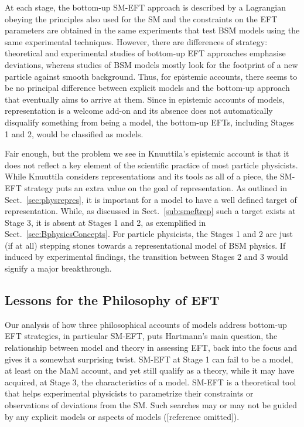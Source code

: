 At each stage, the bottom-up SM-EFT approach is described by a Lagrangian 
obeying the principles also used for the SM and the constraints on the EFT parameters are obtained in the same experiments that test BSM models using the same experimental techniques. 
However, there are differences of strategy: theoretical and experimental studies of bottom-up EFT approaches emphasise deviations, whereas studies of BSM models mostly look for the footprint of a new particle against smooth background.
Thus, for epistemic accounts, there seems to be no principal difference between explicit models and the bottom-up approach that eventually aims to arrive at them. 
Since in epistemic accounts of models, representation is a welcome add-on and its absence does not automatically disqualify something from being a model, the bottom-up EFTs, including Stages 1 and 2, would be classified as models.


Fair enough, but the problem we see in Knuuttila's epistemic account is that it does not reflect a key element of the scientific practice of most particle physicists. 
While Knuuttila considers representations and its tools as all of a piece, the SM-EFT strategy puts an extra value on the goal of representation. 
As outlined in Sect.~\ref{sec:physrepres}, it is important for a model to have a well defined target of representation. 
While, as discussed in Sect.~\ref{sub:smeftrep} such a target exists at Stage 3, it is absent at Stages 1 and 2, as exemplified in Sect.~\ref{sec:BphysicsConcepts}. 
For particle physicists, the Stages 1 and 2 are just (if at all) stepping stones towards a representational model of BSM physics.
If induced by experimental findings, the transition between Stages 2 and 3 would signify a major breakthrough.

\subsection{Lessons for the Philosophy of EFT} \label{sub:EFT}

Our analysis of how three philosophical accounts of models address bottom-up EFT strategies, in particular SM-EFT, puts Hartmann's main question, the relationship between model and theory in assessing EFT, back into the focus and gives it a somewhat surprising twist.
SM-EFT at Stage 1 can fail to be a model, at least on the MaM account, and yet still qualify as a theory, while it may have acquired, at Stage 3, the characteristics of a model.
SM-EFT is a theoretical tool that helps experimental physicists to parametrize their constraints or observations of deviations from the SM. 
Such searches may or may not be guided by any explicit models or aspects of models ([reference omitted]).

